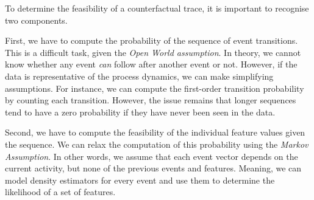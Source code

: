 \documentclass[./../../paper.tex]{subfiles}
\begin{document}
To determine the feasibility of a counterfactual trace, it is important to recognise two components. 

First, we have to compute the probability of the sequence of event transitions. This is a difficult task, given the \emph{Open World assumption}. In theory, we cannot know whether any event \emph{can} follow after another event or not. However, if the data is representative of the process dynamics, we can make simplifying assumptions. For instance, we can compute the first-order transition probability by counting each transition. However, the issue remains that longer sequences tend to have a zero probability if they have never been seen in the data. %

Second, we have to compute the feasibility of the individual feature values given the sequence. We can relax the computation of this probability using the \emph{Markov Assumption}. In other words, we assume that each event vector depends on the current activity, but none of the previous events and features. Meaning, we can model density estimators for every event and use them to determine the likelihood of a set of features.  



\end{document}
